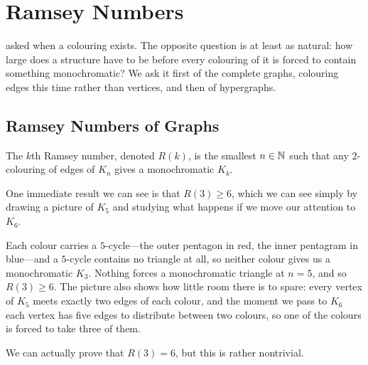 \section{Ramsey Numbers}

 asked when a colouring exists. The opposite question is at least as natural: how large does a structure have to be before every colouring of it is forced to contain something monochromatic? We ask it first of the complete graphs, colouring edges this time rather than vertices, and then of hypergraphs.

\subsection{Ramsey Numbers of Graphs}

\begin{boxdefinition}
    The $k$th Ramsey number, denoted $R(k)$, is the smallest $n \in \mathbb{N}$ such that any $2$-colouring of edges of $K_n$ gives a monochromatic $K_k$.
\end{boxdefinition}

One immediate result we can see is that $R(3) \geq 6$, which we can see simply by drawing a picture of $K_5$ and studying what happens if we move our attention to $K_6$.

\begin{figure}[H]
    \centering
\end{figure}

Each colour carries a $5$-cycle---the outer pentagon in red, the inner pentagram in blue---and a $5$-cycle contains no triangle at all, so neither colour gives us a monochromatic $K_3$. Nothing forces a monochromatic triangle at $n = 5$, and so $R(3) \geq 6$. The picture also shows how little room there is to spare: every vertex of $K_5$ meets exactly two edges of each colour, and the moment we pass to $K_6$ each vertex has five edges to distribute between two colours, so one of the colours is forced to take three of them.

We can actually prove that $R(3) = 6$, but this is rather nontrivial.


